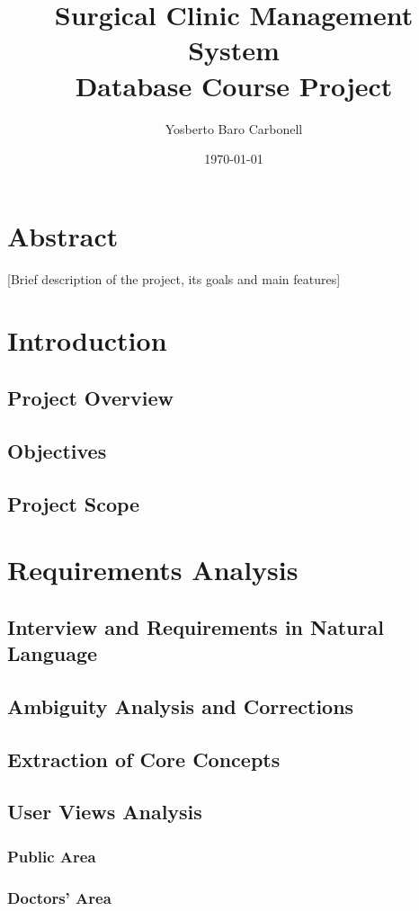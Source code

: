 \documentclass[12pt,a4paper]{report}
\title{{\Huge Surgical Clinic Management System}\\[1cm]
       {\Large Database Course Project}}
\author{Yosberto Baro Carbonell}
\date{\today}
\begin{document}
\maketitle

\chapter*{Abstract}
[Brief description of the project, its goals and main features]

\tableofcontents

\chapter{Introduction}
\section{Project Overview}
\section{Objectives}
\section{Project Scope}

\chapter{Requirements Analysis}
\section{Interview and Requirements in Natural Language}
\section{Ambiguity Analysis and Corrections}
\section{Extraction of Core Concepts}
\section{User Views Analysis}
\subsection{Public Area}
\subsection{Doctors' Area}
\end{document}
